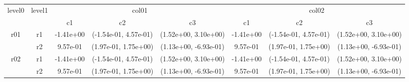 \begin{tabular}{cccccccc}
\toprule
\multirow{2}{*}{level0} & \multirow{2}{*}{level1}&\multicolumn{3}{c}{col01}&\multicolumn{3}{c}{col02}\tabularnewline
\cmidrule(lr){3-5}
\cmidrule(lr){6-8}
&&c1&c2&c3&c1&c2&c3\tabularnewline
\midrule
\midrule
\multirow{2}{*}{r01}&r1&-1.41e+00& (-1.54e-01, 4.57e-01)& (1.52e+00, 3.10e+00)&-1.41e+00& (-1.54e-01, 4.57e-01)& (1.52e+00, 3.10e+00)\tabularnewline
&r2&9.57e-01& (1.97e-01, 1.75e+00)& (1.13e+00, -6.93e-01)&9.57e-01& (1.97e-01, 1.75e+00)& (1.13e+00, -6.93e-01)\tabularnewline
\midrule
\multirow{2}{*}{r02}&r1&-1.41e+00& (-1.54e-01, 4.57e-01)& (1.52e+00, 3.10e+00)&-1.41e+00& (-1.54e-01, 4.57e-01)& (1.52e+00, 3.10e+00)\tabularnewline
&r2&9.57e-01& (1.97e-01, 1.75e+00)& (1.13e+00, -6.93e-01)&9.57e-01& (1.97e-01, 1.75e+00)& (1.13e+00, -6.93e-01)\tabularnewline
\bottomrule
\end{tabular}

